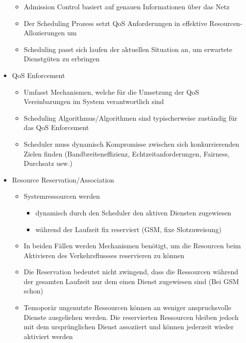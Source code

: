 \begin{itemize}
\begin{itemize}
\item Admission Control basiert auf genauen Informationen über das Netz
\item Der Scheduling Prozess setzt QoS Anforderungen in effektive Resourcen-Allozierungen um
\item Scheduling passt sich laufen der aktuellen Situation an, um erwartete Dienstgüten zu erbringen
\end{itemize}
\item QoS Enforcement
\begin{itemize}
\item Umfasst Mechanismen, welche für die Umsetzung der QoS Vereinbarungen im System verantwortlich sind
\item Scheduling Algorithmus/Algorithmen sind typischerweise zuständig für das QoS Enforcement
\item Scheduler muss dynamisch Kompromisse zwischen sich konkurrierenden Zielen finden (Bandbreiteneffizienz, Echtzeitanforderungen, Fairness, Durchsatz usw.)
\end{itemize}
\item Resource Reservation/Association
\begin{itemize}
\item Systemressourcen werden 
\begin{itemize}
\item dynamisch durch den Scheduler den aktiven Diensten zugewiesen
\item während der Laufzeit fix reserviert (GSM, fixe Slotzuweisung)
\end{itemize}
\item In beiden Fällen werden Mechanismen benötigt, um die Resourcen beim Aktivieren des Verkehrsflussses reservieren zu können
\item Die Reservation bedeutet nicht zwingend, dass die Ressourcen während der gesamten Laufzeit nur dem einen Dienst zugewiesen sind (Bei GSM schon)
\item Temoporär ungenutzte Ressourcen können an weniger anspruchsvolle Dienste ausgeliehen werden. Die reservierten Ressourcen bleiben jedoch mit dem ursprünglichen Dienst assoziiert und können jederzeit wieder aktiviert werden
\end{itemize}
\end{itemize}


